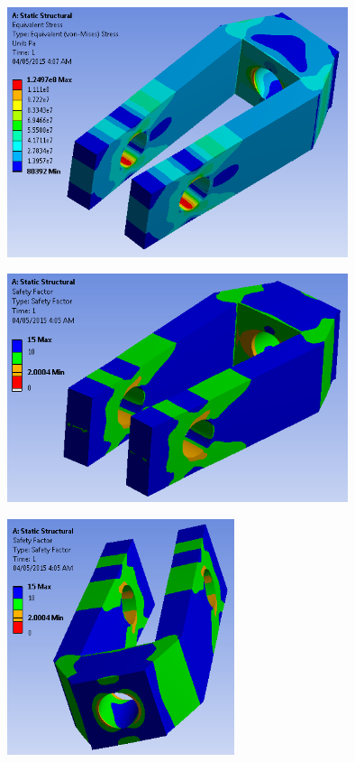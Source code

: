 \documentclass[a4paper,14pt]{extarticle}
\begin{document}
\begin{center}\includegraphics[width=0.75\textwidth]{EX_3.PNG}\end{center}

\begin{center}\includegraphics[width=0.75\textwidth]{EX_2.PNG}\end{center}

\begin{center}\includegraphics[width=0.5\textwidth]{EX_1.PNG}\end{center}
\end{document}

